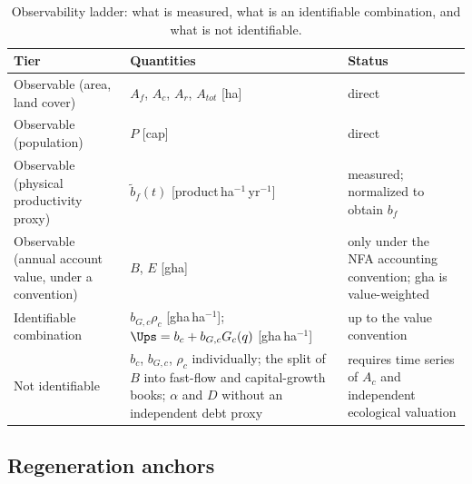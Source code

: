 \begin{table}[htbp]
\centering\small
\caption{Observability ladder: what is measured, what is an identifiable combination, and what is not identifiable.}
\label{tab:si_ladder}
\begin{tabularx}{\textwidth}{>{\raggedright\arraybackslash}p{} X >{\raggedright\arraybackslash}p{}}
\toprule
Tier & Quantities & Status \\
\midrule
Observable (area, land cover) & $A_f$, $A_c$, $A_r$, $A_{tot}$ [ha] & direct \\
Observable (population) & $P$ [cap] & direct \\
Observable (physical productivity proxy) & $\tilde b_f(t)$ [product\,ha$^{-1}$\,yr$^{-1}$] & measured; normalized to obtain $b_f$ \\
Observable (annual account value, under a convention) & $B$, $E$ [gha] & only under the NFA accounting convention; gha is value-weighted \\
Identifiable combination & $b_{G,c}\rho_c$ [gha\,ha$^{-1}$]; $\Ups=b_c+b_{G,c}G_c(q)$ [gha\,ha$^{-1}$] & up to the value convention \\
Not identifiable & $b_c$, $b_{G,c}$, $\rho_c$ individually; the split of $B$ into fast-flow and capital-growth books; $\alpha$ and $D$ without an independent debt proxy & requires time series of $A_c$ and independent ecological valuation \\
\bottomrule
\end{tabularx}
\end{table}

\subsection{Regeneration anchors}\label{si:anchors}

